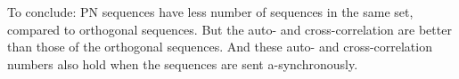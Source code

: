 To conclude: PN sequences have less number of sequences in the same set, compared to orthogonal sequences.
But the auto- and cross-correlation are better than those of the orthogonal sequences.
And these auto- and cross-correlation numbers also hold when the sequences are sent a-synchronously.










